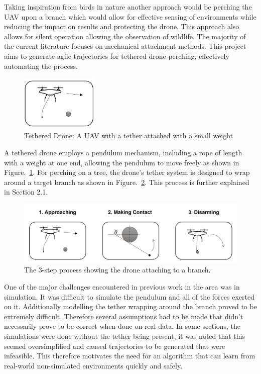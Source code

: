 Taking inspiration from birds in nature another approach would be perching the UAV upon a branch which would allow for effective sensing of environments while reducing the impact on results and protecting the drone.
This approach also allows for silent operation allowing the observation of wildlife.
The majority of the current literature focuses on mechanical attachment methods.
This project aims to generate agile trajectories for tethered drone perching, effectively automating the process.


\begin{figure}[htbp]
  \centering
  \includegraphics[width=0.33\textwidth]{introduction/tetheredDroneImage.png}
  \caption{Tethered Drone: A UAV with a tether attached with a small weight}
\label{fig:intro-tethered-drone}
\end{figure}

A tethered drone employs a pendulum mechanism, including a rope of length with a weight at one end, allowing the pendulum to move freely as shown in Figure.~\ref*{fig:intro-tethered-drone}.
For perching on a tree, the drone's tether system is designed to wrap around a target branch as shown in Figure.~\ref{fig:intro-wrapping}.
This process is further explained in Section 2.1.

\begin{figure}[htbp]
  \centering
  \includegraphics[width=\textwidth]{introduction/dronePerching.png}
  \caption{The 3-step process showing the drone attaching to a branch.}
\label{fig:intro-wrapping}
\end{figure}

One of the major challenges encountered in previous work in the area was in simulation.
It was difficult to simulate the pendulum and all of the forces exerted on it.
Additionally modelling the tether wrapping around the branch proved to be extremely difficult.
Therefore several assumptions had to be made that didn't necessarily prove to be correct when done on real data.
In some sections, the simulations were done without the tether being present, it was noted that this seemed oversimplified and caused trajectories to be generated that were infeasible.
This therefore motivates the need for an algorithm that can learn from real-world non-simulated environments quickly and safely.

